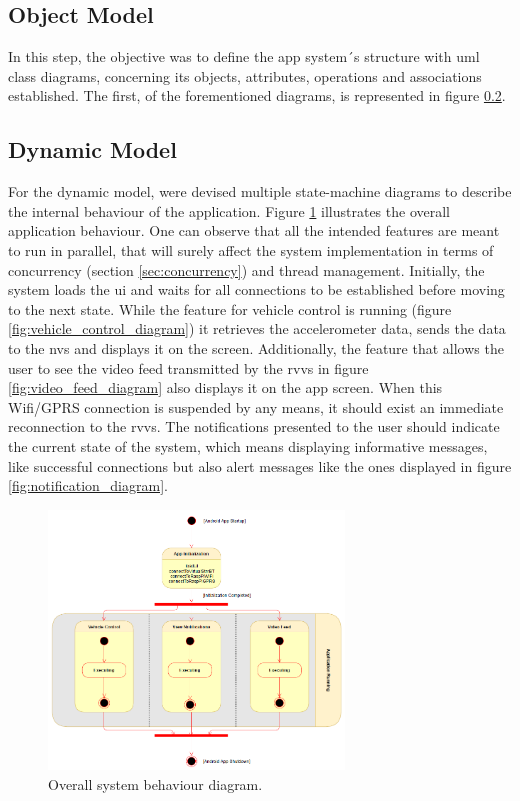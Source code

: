 \subsection{Object Model}
In this step, the objective was to define the app system´s structure with \gls{uml} class diagrams, concerning its objects, attributes, operations and associations established.  The first, of the forementioned diagrams, is represented in figure \ref{}.
%
\subsection{Dynamic Model}
For the dynamic model, were devised multiple state-machine diagrams to describe the internal behaviour of the application. 
%
Figure \ref{fig:overall_system_diagram} illustrates the overall application behaviour. One can observe that all the intended features are meant to run in parallel, that will surely affect the system implementation in terms of concurrency (section \ref{sec:concurrency}) and thread management.
%
Initially, the system loads the \gls{ui} and waits for all connections to be established before moving to the next state.
%
While the feature for vehicle control is running (figure \ref{fig:vehicle_control_diagram}) it retrieves the accelerometer data, sends the data to the \gls{nvs} and displays it on the screen.
%
Additionally, the feature that allows the user to see the video feed transmitted by the \gls{rvvs} in figure \ref{fig:video_feed_diagram} also displays it on the app screen. When this Wifi/GPRS connection is suspended by any means, it should exist an immediate reconnection to the \gls{rvvs}.
%
The notifications presented to the user should indicate the current state of the system, which means displaying informative messages, like successful connections but also alert messages like the ones displayed in figure \ref{fig:notification_diagram}.
%
\begin{figure}[!ht]
\centering
\includegraphics[width=0.7\textwidth]{img/overall_system_sm.png}
\caption{\label{fig:overall_system_diagram}Overall system behaviour diagram.}
\end{figure}
